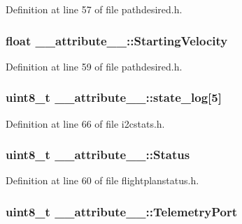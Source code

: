 \-Definition at line 57 of file pathdesired.\-h.

\hypertarget{struct____attribute_____a8bf4ab88e4ab32977ad3a44c4ccdb0e3}{
\subsubsection[{\-Starting\-Velocity}]{\setlength{\rightskip}{0pt plus 5cm}float {\bf \-\_\-\-\_\-attribute\-\_\-\-\_\-\-::\-Starting\-Velocity}}}\label{struct____attribute_____a8bf4ab88e4ab32977ad3a44c4ccdb0e3}


\-Definition at line 59 of file pathdesired.\-h.

\hypertarget{struct____attribute_____a6ecf528c777ae35d5a0585474e809fb1}{
\subsubsection[{state\-\_\-log}]{\setlength{\rightskip}{0pt plus 5cm}uint8\-\_\-t {\bf \-\_\-\-\_\-attribute\-\_\-\-\_\-\-::state\-\_\-log}\mbox{[}5\mbox{]}}}\label{struct____attribute_____a6ecf528c777ae35d5a0585474e809fb1}


\-Definition at line 66 of file i2cstats.\-h.

\hypertarget{struct____attribute_____a486ea1e9933b56f787ad2e87a96cc81c}{
\subsubsection[{\-Status}]{\setlength{\rightskip}{0pt plus 5cm}uint8\-\_\-t {\bf \-\_\-\-\_\-attribute\-\_\-\-\_\-\-::\-Status}}}\label{struct____attribute_____a486ea1e9933b56f787ad2e87a96cc81c}


\-Definition at line 60 of file flightplanstatus.\-h.

\hypertarget{struct____attribute_____ad54e844e59df26c723ec926a434a0e6f}{
\subsubsection[{\-Telemetry\-Port}]{\setlength{\rightskip}{0pt plus 5cm}uint8\-\_\-t {\bf \-\_\-\-\_\-attribute\-\_\-\-\_\-\-::\-Telemetry\-Port}}}\label{struct____attribute_____ad54e844e59df26c723ec926a434a0e6f}


